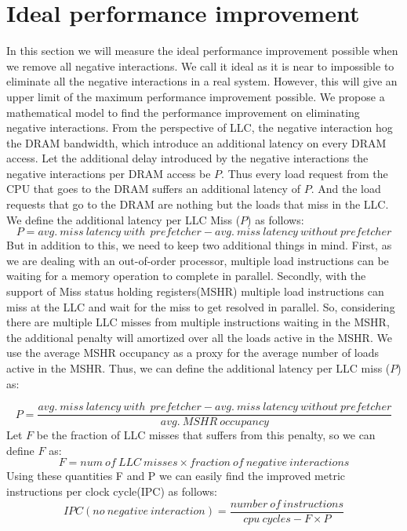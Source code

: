 \section{Ideal performance improvement}
In this section we will measure the ideal performance improvement possible when we remove all negative interactions. We call it ideal as it is near to impossible to eliminate all the negative interactions in a real system. However, this will give an upper limit of the maximum performance improvement possible. We propose a mathematical model to find the performance improvement on eliminating negative interactions. From the perspective of LLC, the negative interaction hog the DRAM bandwidth, which introduce an additional latency on every DRAM access. Let the additional delay introduced by the negative interactions the negative interactions per DRAM access be $P$. Thus every load request from the CPU that goes to the DRAM suffers an additional latency of $P$. And the load requests that go to the DRAM are nothing but the loads that miss in the LLC. We define the additional latency per LLC Miss ($P$) as follows:
\begin{equation}
    P = avg. \ miss \  latency \ with \  \ prefetcher - avg. \  miss \ latency \ without \ prefetcher
\end{equation}
But in addition to this, we need to keep two additional things in mind. First, as we are dealing with an out-of-order processor, multiple load instructions can be waiting for a memory operation to complete in parallel. Secondly, with the support of Miss status holding registers(MSHR) multiple load instructions can miss at the LLC and wait for the miss to get resolved in parallel. So, considering there are multiple LLC misses from multiple instructions waiting in the MSHR, the additional penalty will amortized over all the loads active in the MSHR. We use the average MSHR occupancy as a proxy for the average number of loads active in the MSHR. Thus, we can define the additional latency per LLC miss ($P$) as:

\begin{equation}
    P = \frac{avg. \ miss \  latency \ with \  \ prefetcher - avg. \  miss \ latency \ without \ prefetcher}{avg. \ MSHR \ occupancy}
\end{equation}
Let $F$ be the fraction of LLC misses that suffers from this penalty, so we can define $F$ as:
\begin{equation}
    F = num \ of \ LLC \ misses \times fraction \ of \ negative \ interactions
\end{equation}
Using these quantities F and P we can easily find the improved metric instructions per clock cycle(IPC) as follows:
\begin{equation}
    IPC(no \ negative \ interaction) = \frac{number \ of \ instructions}{cpu \ cycles - F \times P}
\end{equation}

